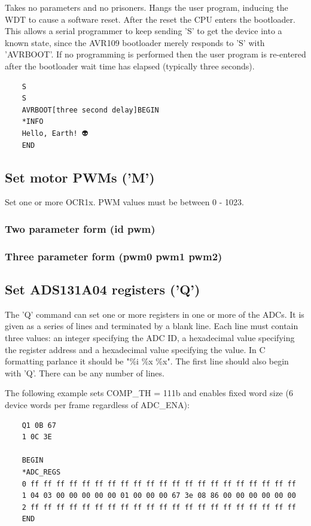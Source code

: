 \documentclass{article}
\begin{document}
Takes no parameters and no prisoners.
Hangs the user program, inducing the WDT to cause a software reset.
After the reset the CPU enters the bootloader.
This allows a serial programmer to keep sending 'S' to get the device into a known state,
since the AVR109 bootloader merely responds to 'S' with 'AVRBOOT'.
If no programming is performed then the user program is re-entered after the bootloader wait time has elapsed (typically three seconds).

\begin{lstlisting}
    S
    S
    AVRBOOT[three second delay]BEGIN
    *INFO
    Hello, Earth! 👽
    END
\end{lstlisting}


\subsection{Set motor PWMs ('M')}

Set one or more OCR1x.
PWM values must be between 0 - 1023.

\subsubsection{Two parameter form (id pwm)}

\subsubsection{Three parameter form (pwm0 pwm1 pwm2)}

\subsection{Set ADS131A04 registers ('Q')}

The 'Q' command can set one or more registers in one or more of the ADCs.
It is given as a series of lines and terminated by a blank line.
Each line must contain three values: an integer specifying the ADC ID,
a hexadecimal value specifying the register address and a hexadecimal value specifying the value.
In C formatting parlance it should be "\%i \%x \%x".
The first line should also begin with 'Q'.
There can be any number of lines.

The following example sets COMP\_TH = 111b and enables fixed word size (6 device words per frame regardless of ADC\_ENA):

\begin{lstlisting}
    Q1 0B 67
    1 0C 3E

    BEGIN
    *ADC_REGS
    0 ff ff ff ff ff ff ff ff ff ff ff ff ff ff ff ff ff ff ff ff ff
    1 04 03 00 00 00 00 00 01 00 00 00 67 3e 08 86 00 00 00 00 00 00
    2 ff ff ff ff ff ff ff ff ff ff ff ff ff ff ff ff ff ff ff ff ff
    END
\end{lstlisting}
\end{document}
